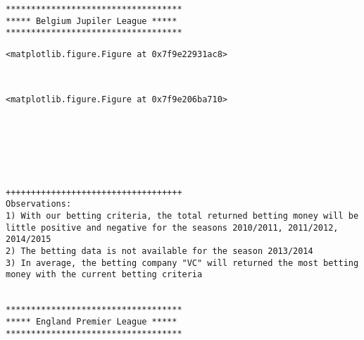 \documentclass[11pt]{article}
\begin{document}
    \begin{Verbatim}[commandchars=\\\{\}]
***********************************
***** Belgium Jupiler League *****
***********************************

    \end{Verbatim}

    
    \begin{verbatim}
<matplotlib.figure.Figure at 0x7f9e22931ac8>
    \end{verbatim}

    
    \begin{center}
    \end{center}
    { \hspace*{\fill} \\}
    
    
    \begin{verbatim}
<matplotlib.figure.Figure at 0x7f9e206ba710>
    \end{verbatim}

    
    \begin{center}
    \end{center}
    { \hspace*{\fill} \\}
    
    \begin{center}
    \end{center}
    { \hspace*{\fill} \\}
    
    \begin{center}
    \end{center}
    { \hspace*{\fill} \\}
    
    \begin{Verbatim}[commandchars=\\\{\}]
+++++++++++++++++++++++++++++++++++
Observations: 
1) With our betting criteria, the total returned betting money will be little positive and negative for the seasons 2010/2011, 2011/2012, 2014/2015 
2) The betting data is not available for the season 2013/2014
3) In average, the betting company "VC" will returned the most betting money with the current betting criteria


***********************************
***** England Premier League *****
***********************************

    \end{Verbatim}
\end{document}
